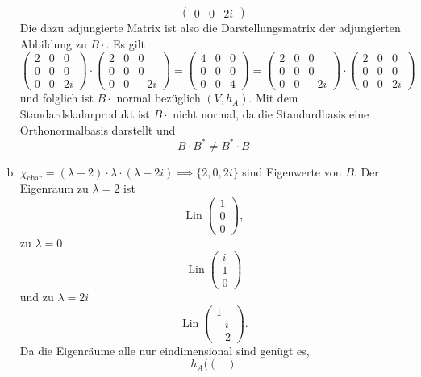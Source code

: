 \documentclass{article}
\theoremstyle{definition}
\begin{document}
\begin{enumerate}[(a)]
$$\begin{pmatrix}
		0 & 0 & 2i
	\end{pmatrix}$$
	Die dazu adjungierte Matrix ist also die Darstellungsmatrix der adjungierten Abbildung zu $B\cdot$.
	Es gilt
	$$\begin{pmatrix}
		2 & 0 & 0\\
		0 & 0 & 0\\
		0 & 0 & 2i
	\end{pmatrix} \cdot \begin{pmatrix}
		2 & 0 & 0\\
		0 & 0 & 0\\
		0 & 0 & -2i
	\end{pmatrix} = \begin{pmatrix}
		4 & 0 & 0\\
		0 & 0 & 0\\
		0 & 0 & 4
	\end{pmatrix} = \begin{pmatrix}
		2 & 0 & 0\\
		0 & 0 & 0\\
		0 & 0 & -2i
	\end{pmatrix} \cdot \begin{pmatrix}
		2 & 0 & 0\\
		0 & 0 & 0\\
		0 & 0 & 2i
	\end{pmatrix}$$ und folglich ist $B\cdot $ normal bezüglich $(V, h_A)$.
	Mit dem Standardskalarprodukt ist $B \cdot$ nicht normal, da die Standardbasis eine Orthonormalbasis darstellt und $$B \cdot B^* \neq B^* \cdot B$$
	\item $\chi_\text{char} = (\lambda - 2)\cdot \lambda \cdot (\lambda - 2i) \implies \{2, 0, 2i\}$ sind Eigenwerte von $B$. Der Eigenraum zu $\lambda = 2$ ist $$\operatorname{Lin} \begin{pmatrix}
		1\\ 0 \\ 0
	\end{pmatrix},$$ zu $\lambda = 0$ $$\operatorname{Lin} \begin{pmatrix}
		i\\1\\0
	\end{pmatrix}$$ und zu $\lambda = 2i$ $$\operatorname{Lin} \begin{pmatrix}
		1\\ -i\\ -2
	\end{pmatrix}.$$ Da die Eigenräume alle nur eindimensional sind genügt es, $$h_A(\begin{pmatrix}

\end{pmatrix}$$
\end{enumerate}
\end{document}

